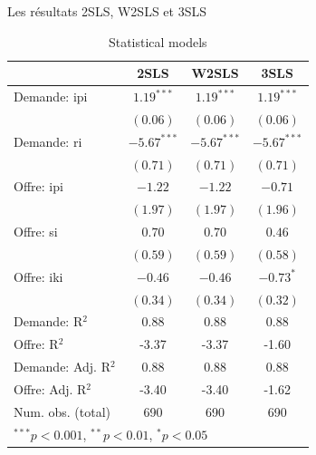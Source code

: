\documentclass[11pt,ignorenonframetext,]{beamer}
\begin{document}
\begin{frame}{Les résultats 2SLS, W2SLS et 3SLS}
\protect\hypertarget{les-resultats-2sls-w2sls-et-3sls}{}

\tiny

\begin{table}
\begin{center}
\begin{tabular}{l c c c }
\hline
 & 2SLS & W2SLS & 3SLS \\
\hline
Demande: ipi        & $1.19^{***}$  & $1.19^{***}$  & $1.19^{***}$  \\
                    & $(0.06)$      & $(0.06)$      & $(0.06)$      \\
Demande: ri         & $-5.67^{***}$ & $-5.67^{***}$ & $-5.67^{***}$ \\
                    & $(0.71)$      & $(0.71)$      & $(0.71)$      \\
Offre: ipi          & $-1.22$       & $-1.22$       & $-0.71$       \\
                    & $(1.97)$      & $(1.97)$      & $(1.96)$      \\
Offre: si           & $0.70$        & $0.70$        & $0.46$        \\
                    & $(0.59)$      & $(0.59)$      & $(0.58)$      \\
Offre: iki          & $-0.46$       & $-0.46$       & $-0.73^{*}$   \\
                    & $(0.34)$      & $(0.34)$      & $(0.32)$      \\
\hline
Demande: R$^2$      & 0.88          & 0.88          & 0.88          \\
Offre: R$^2$        & -3.37         & -3.37         & -1.60         \\
Demande: Adj. R$^2$ & 0.88          & 0.88          & 0.88          \\
Offre: Adj. R$^2$   & -3.40         & -3.40         & -1.62         \\
Num. obs. (total)   & 690           & 690           & 690           \\
\hline
\multicolumn{4}{l}{\scriptsize{$^{***}p<0.001$, $^{**}p<0.01$, $^*p<0.05$}}
\end{tabular}
\caption{Statistical models}
\label{table : 2sls, w2sls and 3sls}
\end{center}
\end{table}
\tiny

\end{frame}
\end{document}
